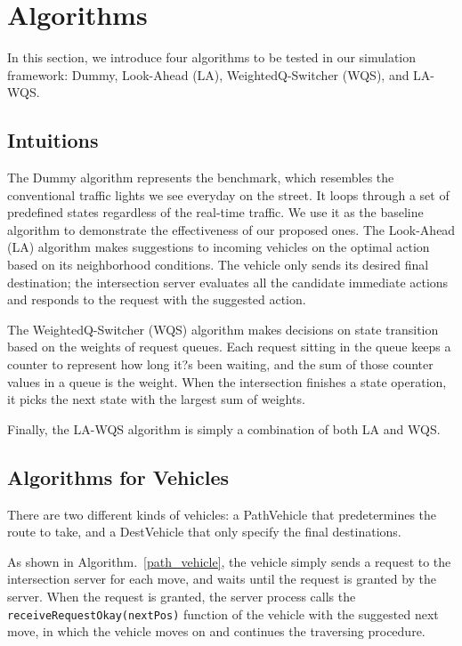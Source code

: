 \documentclass[conference]{IEEEtran}
\begin{document}
\section{Algorithms}
In this section, we introduce four algorithms to be tested in our simulation framework: Dummy, Look-Ahead (LA), WeightedQ-Switcher (WQS), and LA-WQS.

\subsection{Intuitions}
The Dummy algorithm represents the benchmark, which resembles the conventional traffic lights we see everyday on the street. It loops through a set of predefined states regardless of the real-time traffic. We use it as the baseline algorithm to demonstrate the effectiveness of our proposed ones.
The Look-Ahead (LA) algorithm makes suggestions to incoming vehicles on the optimal action based on its neighborhood conditions. The vehicle only sends its desired final destination; the intersection server evaluates all the candidate immediate actions and responds to the request with the suggested action.

The WeightedQ-Switcher (WQS) algorithm makes decisions on state transition based on the weights of request queues. Each request sitting in the queue keeps a counter to represent how long it?s been waiting, and the sum of those counter values in a queue is the weight. When the intersection finishes a state operation, it picks the next state with the largest sum of weights.

Finally, the LA-WQS algorithm is simply a combination of both LA and WQS.

\subsection{ Algorithms for Vehicles}
There are two different kinds of vehicles: a PathVehicle that predetermines the route to take, and a DestVehicle that only specify the final destinations. 

As shown in Algorithm.~\ref{path_vehicle}, the vehicle simply sends a request to the intersection server for each move, and waits until the request is granted by the server. When the request is granted, the server process calls the \texttt{receiveRequestOkay(nextPos)} function of the vehicle with the suggested next move, in which the vehicle moves on and continues the traversing procedure.
\end{document}
